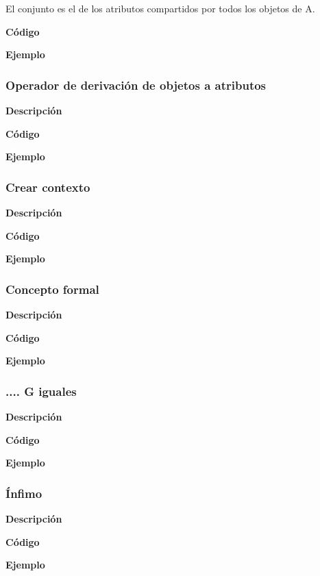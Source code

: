         El conjunto es el de los atributos compartidos por todos los objetos de A.

        \textbf{C\'odigo}


        \textbf{Ejemplo}

    \subsubsection{Operador de derivaci\'on de objetos a atributos}

        \textbf{Descripci\'on}


        \textbf{C\'odigo}


        \textbf{Ejemplo}

    \subsubsection{Crear contexto}

        \textbf{Descripci\'on}


        \textbf{C\'odigo}


        \textbf{Ejemplo}

    \subsubsection{Concepto formal}

    
        \textbf{Descripci\'on}


        \textbf{C\'odigo}


        \textbf{Ejemplo}

    \subsubsection{.... G iguales}

        
        \textbf{Descripci\'on}


        \textbf{C\'odigo}


        \textbf{Ejemplo}


    \subsubsection{\'Infimo}

    
        \textbf{Descripci\'on}


        \textbf{C\'odigo}


        \textbf{Ejemplo}


